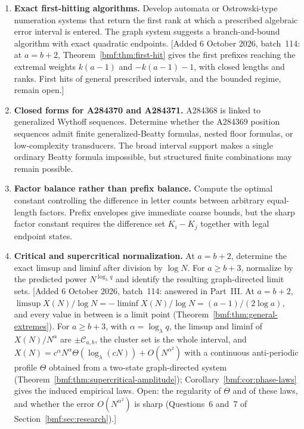 \documentclass[11pt]{article}
\numberwithin{equation}{section}
\theoremstyle{definition}
\theoremstyle{remark}
\begin{document}
\begin{enumerate}[leftmargin=*,itemsep=5pt]
\item \textbf{Exact first-hitting algorithms.}
Develop automata or Ostrowski-type numeration systems that return the first
rank at which a prescribed algebraic error interval is entered.  The graph
system suggests a branch-and-bound algorithm with exact quadratic endpoints.
[Added 6 October 2026, batch~114: at $a=b+2$,
Theorem~\ref{bmf:thm:first-hit} gives the first prefixes reaching the
extremal weights $k(a-1)$ and $-k(a-1)-1$, with closed lengths and ranks.
First hits of general prescribed intervals, and the bounded regime, remain
open.]

\item \textbf{Closed forms for A284370 and A284371.}
A284368 is linked to generalized Wythoff sequences.  Determine whether the
A284369 position sequences admit finite generalized-Beatty formulas, nested
floor formulas, or low-complexity transducers.  The broad interval support
makes a single ordinary Beatty formula impossible, but structured finite
combinations may remain possible.

\item \textbf{Factor balance rather than prefix balance.}
Compute the optimal constant controlling the difference in letter counts
between arbitrary equal-length factors.  Prefix envelopes give immediate
coarse bounds, but the sharp factor constant requires the difference set
$K_i-K_j$ together with legal endpoint states.

\item \textbf{Critical and supercritical normalization.}
At $a=b+2$, determine the exact limsup and liminf after division by
$\log N$.  For $a\geq b+3$, normalize by the predicted power
$N^{\log_\lambda q}$ and identify the resulting graph-directed limit sets.
[Added 6 October 2026, batch~114: answered in Part~III. At $a=b+2$,
$\limsup X(N)/\log N=-\liminf X(N)/\log N=(a-1)/(2\log a)$, and every
value in between is a limit point (Theorem~\ref{bmf:thm:general-extremes}).
For $a\geq b+3$, with $\alpha=\log_\lambda q$, the limsup and liminf of
$X(N)/N^\alpha$ are $\pm\mathcal C_{a,b}$, the cluster set is the whole
interval, and $X(N)=c^\alpha N^\alpha\Theta(\log_\lambda(cN))+O(N^{\alpha^2})$
with a continuous anti-periodic profile $\Theta$ obtained from a two-state
graph-directed system (Theorem~\ref{bmf:thm:supercritical-amplitude});
Corollary~\ref{bmf:cor:phase-laws} gives the induced empirical laws. Open:
the regularity of $\Theta$ and of these laws, and whether the error
$O(N^{\alpha^2})$ is sharp (Questions~6 and~7 of
Section~\ref{bmf:sec:research}).]


\end{enumerate}
\end{document}
